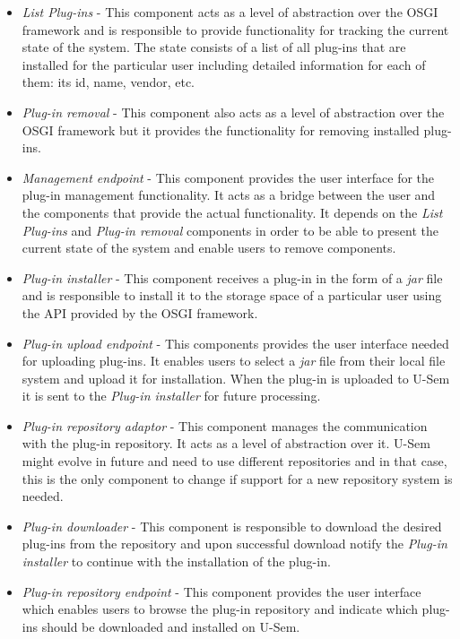 \begin{itemize}

\item \textit{List Plug-ins} - This component acts as a level of abstraction over the OSGI framework and is responsible to provide functionality for tracking the current state of the system. The state consists of a list of all plug-ins that are installed for the particular user including detailed information for each of them: its id, name, vendor, etc.

\item \textit{Plug-in removal} - This component also acts as a level of abstraction over the OSGI framework but it provides the functionality for removing installed plug-ins.

\item \textit{Management endpoint} - This component provides the user interface for the plug-in management functionality. It acts as a bridge between the user and the components that provide the actual functionality. It depends on the \textit{List Plug-ins} and \textit{Plug-in removal} components in order to be able to present the current state of the system and enable users to remove components.

\item \textit{Plug-in installer} - This component receives a plug-in in the form of a \textit{jar} file and is responsible to install it to the storage space of a particular user using the API provided by the OSGI framework.

\item \textit{Plug-in upload endpoint} - This components provides the user interface needed for uploading plug-ins. It enables users to select a \textit{jar} file from their local file system and upload it for installation. When the plug-in is uploaded to U-Sem it is sent to the \textit{Plug-in installer} for future processing.

\item \textit{Plug-in repository adaptor} - This component manages  the communication with the plug-in repository. It acts as a level of abstraction over it. U-Sem might evolve in future and need to use different repositories and in that case, this is the only component to change if support for a new repository system is needed. 

\item \textit{Plug-in downloader} - This component is responsible to download the desired plug-ins from the repository and upon successful download notify the \textit{Plug-in installer} to continue with the installation of the plug-in.

\item \textit{Plug-in repository endpoint} - This component provides the user interface which enables users to browse the plug-in repository and indicate which plug-ins should be downloaded and installed on U-Sem.

\end{itemize}


